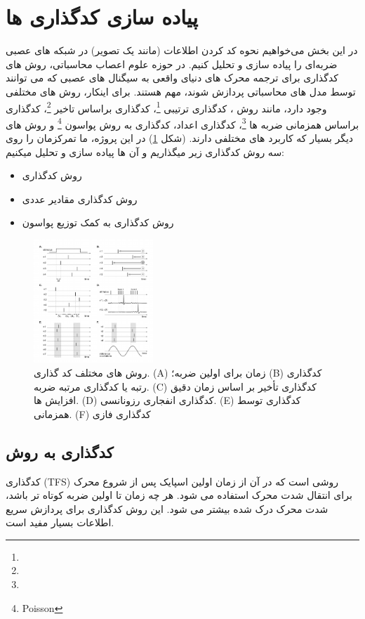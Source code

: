 
\newpage
\section{پیاده سازی کدگذاری ها}
    در این بخش می‌خواهیم نحوه کد کردن اطلاعات
    (مانند یک تصویر) 
    در شبکه های عصبی ضربه‌ای را پیاده سازی و تحلیل کنیم.
    در حوزه علوم اعصاب محاسباتی، روش های کدگذاری برای ترجمه محرک های دنیای واقعی به سیگنال های عصبی که می توانند توسط مدل های محاسباتی پردازش شوند، مهم هستند.
    برای اینکار، روش های مختلفی وجود دارد، مانند روش 
    ، 
    کدگذاری ترتیبی
    \footnote{}، 
    کدگذاری براساس تاخیر
    \footnote{}، 
    کدگذاری براساس همزمانی ضربه ها
    \footnote{}، 
    کدگذاری اعداد، کدگذاری به روش پواسون
    \footnote{Poisson} 
    و روش های دیگر بسیار که کاربرد های مختلفی دارند.
    (شکل \ref{fig:encoders})
    در این پروژه، ما تمرکزمان را روی سه روش کدگذاری زیر میگذاریم و آن ها پیاده سازی و تحلیل میکنیم:
    \begin{itemize}
        \item روش کدگذاری 
        \item روش کدگذاری مقادیر عددی
        \item روش کدگذاری به کمک توزیع پواسون
    \end{itemize}

    \begin{figure}[!ht]
        \centering
        \includegraphics[width=0.4\textwidth]{images/encoders.png} 
        \caption{روش های مختلف کد گذاری. 
        (A) زمان برای اولین ضربه؛ (B) کدگذاری رتبه یا کدگذاری مرتبه ضربه. (C) کدگذاری تأخیر بر اساس زمان دقیق افزایش ها. (D) کدگذاری انفجاری رزونانسی. (E) کدگذاری توسط همزمانی. (F) کدگذاری فازی}
        \label{fig:encoders}
    \end{figure}
    \subsection{کدگذاری به روش 
    }
        کدگذاری 
         (TFS)
        روشی است که در آن از زمان اولین اسپایک پس از شروع محرک برای انتقال شدت محرک استفاده می شود. هر چه زمان تا اولین ضربه کوتاه تر باشد، شدت محرک درک شده بیشتر می شود. این روش کدگذاری برای پردازش سریع اطلاعات بسیار مفید است.

